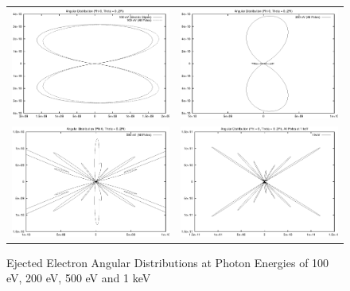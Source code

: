 \begin{figure}[h]
\begin{center}
\begin{tabular}{cc}
    \includegraphics[width=7cm]{ang_100eV_both.eps}
    &
    \includegraphics[width=7cm]{ang_200eV_ap.eps}
    \\
    \includegraphics[width=7cm]{ang_500eV_ap.eps}
    &
    \includegraphics[width=7cm]{ang_1keV_ap.eps}
\end{tabular}
    \caption{Ejected Electron Angular Distributions at Photon Energies of
             100 eV, 200 eV, 500 eV and 1 keV}
    \label{fig:angular-plots}
\end{center}
\end{figure}

